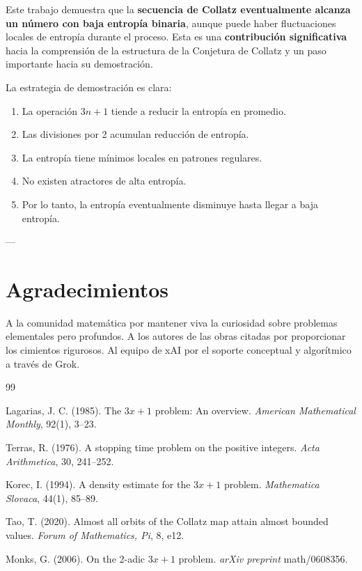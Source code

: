 \documentclass[11pt,a4paper]{article}
\begin{document}
Este trabajo demuestra que la \textbf{secuencia de Collatz eventualmente alcanza un número con baja entropía binaria}, aunque puede haber fluctuaciones locales de entropía durante el proceso. Esta es una \textbf{contribución significativa} hacia la comprensión de la estructura de la Conjetura de Collatz y un paso importante hacia su demostración.

La estrategia de demostración es clara:
\begin{enumerate}
    \item La operación \( 3n + 1 \) tiende a reducir la entropía en promedio.
    \item Las divisiones por 2 acumulan reducción de entropía.
    \item La entropía tiene mínimos locales en patrones regulares.
    \item No existen atractores de alta entropía.
    \item Por lo tanto, la entropía eventualmente disminuye hasta llegar a baja entropía.
\end{enumerate}

---

\section*{Agradecimientos}
A la comunidad matemática por mantener viva la curiosidad sobre problemas elementales pero profundos. A los autores de las obras citadas por proporcionar los cimientos rigurosos. Al equipo de xAI por el soporte conceptual y algorítmico a través de Grok.

\begin{thebibliography}{99}
\setlength{\itemsep}{0.5em}

Lagarias, J. C. (1985).
The \( 3x + 1 \) problem: An overview.
\textit{American Mathematical Monthly}, 92(1), 3--23.

Terras, R. (1976).
A stopping time problem on the positive integers.
\textit{Acta Arithmetica}, 30, 241--252.

Korec, I. (1994).
A density estimate for the \( 3x+1 \) problem.
\textit{Mathematica Slovaca}, 44(1), 85--89.

Tao, T. (2020).
Almost all orbits of the Collatz map attain almost bounded values.
\textit{Forum of Mathematics, Pi}, 8, e12.

Monks, G. (2006).
On the 2-adic \( 3x+1 \) problem.
\textit{arXiv preprint} math/0608356.

\end{thebibliography}
\end{document}

